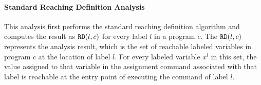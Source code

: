 \paragraph{Standard Reaching Definition Analysis}
This analysis first performs the standard reaching definition algorithm and computes the result as $\mathtt{RD}(l, c)$ for every label $l$ in a program $c$.
The $\mathtt{RD}(l, c)$ represents the analysis result, which is the set of 
reachable labeled variables in program $c$ at the location of label $l$.
For every labeled variable $x^l$ in this set, 
the value assigned to that variable
in the assignment command associated with that label is reachable at the entry point of executing the command of label $l$.

